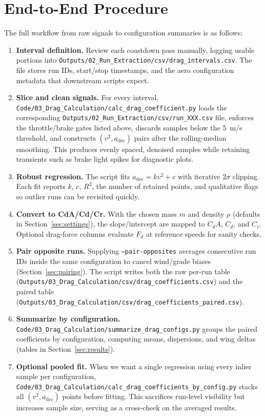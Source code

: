 \documentclass[11pt,a4paper]{article}
\begin{document}
\section{End-to-End Procedure}
The full workflow from raw signals to configuration summaries is as follows:
\begin{enumerate}
  \item \textbf{Interval definition.} Review each coastdown pass manually, logging usable portions into \texttt{Outputs/02\_Run\_Extraction/csv/drag\_intervals.csv}. The file stores run IDs, start/stop timestamps, and the aero configuration metadata that downstream scripts expect.
  \item \textbf{Slice and clean signals.} For every interval, \texttt{Code/03\_Drag\_Calculation/calc\_drag\_coefficient.py} loads the corresponding \texttt{Outputs/02\_Run\_Extraction/csv/run\_XXX.csv} file, enforces the throttle/brake gates listed above, discards samples below the \SI{5}{m/s} threshold, and constructs $(v^2, a_\text{dec})$ pairs after the rolling-median smoothing. This produces evenly spaced, denoised samples while retaining transients such as brake light spikes for diagnostic plots.
  \item \textbf{Robust regression.} The script fits \(a_\text{dec} = k v^2 + c\) with iterative $2\sigma$ clipping. Each fit reports $k$, $c$, $R^2$, the number of retained points, and qualitative flags so outlier runs can be revisited quickly.
  \item \textbf{Convert to CdA/Cd/Cr.} With the chosen mass $m$ and density $\rho$ (defaults in Section~\ref{sec:settings}), the slope/intercept are mapped to \(C_dA\), \(C_d\), and \(C_r\). Optional drag-force columns evaluate $F_d$ at reference speeds for sanity checks.
  \item \textbf{Pair opposite runs.} Supplying \texttt{--pair-opposites} averages consecutive run IDs inside the same configuration to cancel wind/grade biases (Section~\ref{sec:pairing}). The script writes both the raw per-run table (\texttt{Outputs/03\_Drag\_Calculation/csv/drag\_coefficients.csv}) and the paired table (\texttt{Outputs/03\_Drag\_Calculation/csv/drag\_coefficients\_paired.csv}).
  \item \textbf{Summarize by configuration.} \texttt{Code/03\_Drag\_Calculation/summarize\_drag\_configs.py} groups the paired coefficients by configuration, computing means, dispersions, and wing deltas (tables in Section~\ref{sec:results}).
  \item \textbf{Optional pooled fit.} When we want a single regression using every inlier sample per configuration, \texttt{Code/03\_Drag\_Calculation/calc\_drag\_coefficients\_by\_config.py} stacks all $(v^2, a_\text{dec})$ points before fitting. This sacrifices run-level visibility but increases sample size, serving as a cross-check on the averaged results.
\end{enumerate}
\end{document}
